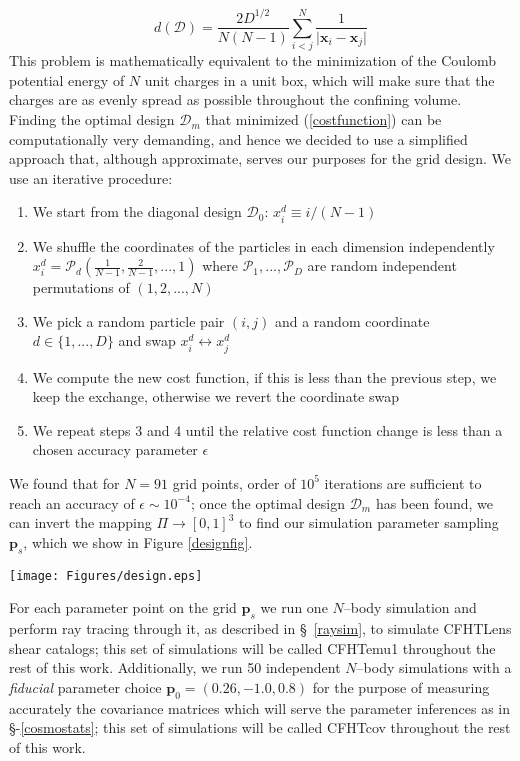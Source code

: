 \documentclass[reprint,aps,prd,superscriptaddress,showkeys]{revtex4-1}
\begin{document}
\begin{equation}
\label{costfunction}
d(\mathcal{D}) = \frac{2D^{1/2}}{N(N-1)}\sum_{i<j}^N\frac{1}{\vert\mathbf{x}_i-\mathbf{x}_j\vert}
\end{equation} 
%
This problem is mathematically equivalent to the minimization of the Coulomb potential energy of $N$ unit charges in a unit box, which will make sure that the charges are as evenly spread as possible throughout the confining volume. Finding the optimal design $\mathcal{D}_m$ that minimized (\ref{costfunction}) can be computationally very demanding, and hence we decided to use a simplified approach that, although approximate, serves our purposes for the grid design. We use an iterative procedure:
\begin{enumerate}
\item We start from the diagonal design $\mathcal{D}_0$: $x_i^d\equiv i/(N-1)$
\item We shuffle the coordinates of the particles in each dimension independently $x_i^d = \mathcal{P}_d\left(\frac{1}{N-1},\frac{2}{N-1},...,1\right)$ where $\mathcal{P}_1,...,\mathcal{P}_D$ are random independent permutations of $(1,2,...,N)$
\item We pick a random particle pair $(i,j)$ and a random coordinate $d\in\{1,...,D\}$ and swap $x_i^d\leftrightarrow x_j^d$
\item We compute the new cost function, if this is less than the previous step, we keep the exchange, otherwise we revert the coordinate swap
\item We repeat steps 3 and 4 until the relative cost function change is less than a chosen accuracy parameter $\epsilon$ 
\end{enumerate}
%
We found that for $N=91$ grid points, order of $10^5$ iterations are sufficient to reach an accuracy of $\epsilon\sim10^{-4}$; once the optimal design $\mathcal{D}_m$ has been found, we can invert the mapping $\Pi\rightarrow[0,1]^3$ to find our simulation parameter sampling $\mathbf{p}_s$, which we show in 
Figure \ref{designfig}.
%
\begin{figure*}
\begin{center}
\texttt{[image: Figures/design.eps]}
\caption{$(\Omega_m,w)$ and $(w,\sigma_8)$ projections of our the simulation design; the blue points correspond to the CFHTemu1 simulation set, which consists of one $N$--body simulation per point, while the red point corresponds to the CFHTcov simulation set, which is based on 50 independent $N$--body simulations}
\label{designfig}
\end{center}
\end{figure*}
%
For each parameter point on the grid $\mathbf{p}_s$ we run one $N$--body simulation and perform ray tracing through it, as described in \S~\ref{raysim}, to simulate CFHTLens shear catalogs; this set of simulations will be called CFHTemu1 throughout the rest of this work. Additionally, we run 50 independent $N$--body simulations with a \textit{fiducial} parameter choice $\mathbf{p}_0=(0.26,-1.0,0.8)$ for the purpose of measuring accurately the covariance matrices which will serve the parameter inferences as in \S-\ref{cosmostats}; this set of simulations will be called CFHTcov throughout the rest of this work.    
\end{document}
